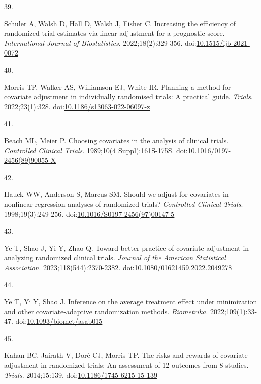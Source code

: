 \documentclass[
  11pt,
]{article}
\newlength{\cslhangindent}
\newlength{\csllabelwidth}
\newenvironment{CSLReferences}[2] %
 {\begin{list}{}{%
  \setlength{\itemindent}{0pt}
  \setlength{\leftmargin}{0pt}
  \setlength{\parsep}{0pt}
  \ifodd #1
   \setlength{\leftmargin}{\cslhangindent}
   \setlength{\itemindent}{-1\cslhangindent}
  \fi
  \setlength{\itemsep}{#2\baselineskip}}}
 {\end{list}}
\newcommand{\CSLLeftMargin}[1]{\parbox[t]{\csllabelwidth}{\strut#1\strut}}
\newcommand{\CSLRightInline}[1]{\parbox[t]{\linewidth - \csllabelwidth}{\strut#1\strut}}
\begin{document}
\begin{CSLReferences}{0}{1}
\CSLLeftMargin{39. }%
\CSLRightInline{Schuler A, Walsh D, Hall D, Walsh J, Fisher C. Increasing the efficiency of randomized trial estimates via linear adjustment for a prognostic score. \emph{International Journal of Biostatistics}. 2022;18(2):329-356. doi:\href{https://doi.org/10.1515/ijb-2021-0072}{10.1515/ijb-2021-0072}}

\CSLLeftMargin{40. }%
\CSLRightInline{Morris TP, Walker AS, Williamson EJ, White IR. Planning a method for covariate adjustment in individually randomised trials: A practical guide. \emph{Trials}. 2022;23(1):328. doi:\href{https://doi.org/10.1186/s13063-022-06097-z}{10.1186/s13063-022-06097-z}}

\CSLLeftMargin{41. }%
\CSLRightInline{Beach ML, Meier P. Choosing covariates in the analysis of clinical trials. \emph{Controlled Clinical Trials}. 1989;10(4 Suppl):161S-175S. doi:\href{https://doi.org/10.1016/0197-2456(89)90055-X}{10.1016/0197-2456(89)90055-X}}

\CSLLeftMargin{42. }%
\CSLRightInline{Hauck WW, Anderson S, Marcus SM. Should we adjust for covariates in nonlinear regression analyses of randomized trials? \emph{Controlled Clinical Trials}. 1998;19(3):249-256. doi:\href{https://doi.org/10.1016/S0197-2456(97)00147-5}{10.1016/S0197-2456(97)00147-5}}

\CSLLeftMargin{43. }%
\CSLRightInline{Ye T, Shao J, Yi Y, Zhao Q. Toward better practice of covariate adjustment in analyzing randomized clinical trials. \emph{Journal of the American Statistical Association}. 2023;118(544):2370-2382. doi:\href{https://doi.org/10.1080/01621459.2022.2049278}{10.1080/01621459.2022.2049278}}

\CSLLeftMargin{44. }%
\CSLRightInline{Ye T, Yi Y, Shao J. Inference on the average treatment effect under minimization and other covariate-adaptive randomization methods. \emph{Biometrika}. 2022;109(1):33-47. doi:\href{https://doi.org/10.1093/biomet/asab015}{10.1093/biomet/asab015}}

\CSLLeftMargin{45. }%
\CSLRightInline{Kahan BC, Jairath V, Doré CJ, Morris TP. The risks and rewards of covariate adjustment in randomized trials: An assessment of 12 outcomes from 8 studies. \emph{Trials}. 2014;15:139. doi:\href{https://doi.org/10.1186/1745-6215-15-139}{10.1186/1745-6215-15-139}}


\end{CSLReferences}
\end{document}
